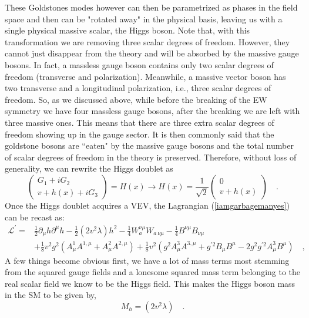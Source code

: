 These Goldstones modes however can then be parametrized as phases in the field space and then can be "rotated away" in the physical basis, leaving us with a single physical massive scalar, the Higgs boson. Note that, with this transformation we are removing three scalar degrees of freedom.  However, they cannot just disappear from the theory and will be absorbed by the massive gauge bosons.
%
In fact, a massless gauge boson contains only two scalar degrees of freedom (transverse and polarization). Meanwhile, a massive vector boson has two transverse and a longitudinal polarization, i.e., three scalar degrees of freedom. So, as we discussed above, while before the breaking of the EW symmetry we have four massless gauge bosons, after the breaking we are left with three massive ones. This means that there are three extra scalar degrees of freedom showing up in the gauge sector. It is then commonly said that the goldstone bosons are ``eaten" by the massive gauge bosons and the total number of scalar degrees of freedom in the theory is preserved. Therefore, without loss of generality, we can rewrite the Higgs doublet as
%
\begin{equation}
 \begin{pmatrix}
G_1 + i G_2 \\ 
v + h(x) + i G_3 
\end{pmatrix} = H (x) \rightarrow H (x) =  \frac{1}{\sqrt{2}} \begin{pmatrix}
0 \\ 
v + h(x) 
\end{pmatrix} \quad .
\label{shame}
\end{equation}
Once the Higgs doublet acquires a VEV, the Lagrangian (\ref{iamgarbagemanyes}) can be recast as:
\begin{align}
\mathcal{L}^\prime = & \frac{1}{2} \partial_\mu h \partial^\mu h - \frac{1}{2} (2v^2 \lambda) h^2
 - \frac{1}{4}  W^{\nu \mu}_a W_{a \,\nu \mu}  
- \frac{1}{4}  B^{\nu \mu} B_{\nu \mu}  \nonumber \\
& + \frac{1}{8} v^2 g^2 (A^1_\mu A^{1,\mu}+ A^2_\mu A^{2,\mu}) +  \frac{1}{8} v^2  (g^2  A^3_\mu A^{3,\mu} + g^{\prime 2} B_\mu B^\mu - 2 g^2 g^{\prime 2} A^3_\mu B^\mu ) \quad , 
\label{complicatedpart}
\end{align}
A few things become obvious first, we have a lot of mass terms most stemming from the squared gauge fields and a lonesome squared mass term belonging to the real scalar field we know to be the Higgs field. This makes the Higgs boson mass in the SM to be given by,
%
\begin{equation}
M_h= (2v^2 \lambda) \quad .  
\end{equation}
